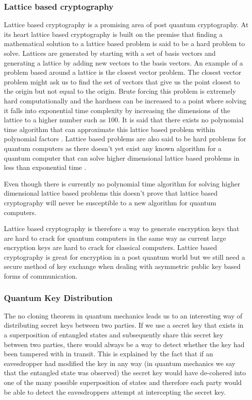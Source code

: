 \documentclass{article}
\begin{document}
\subsubsection{Lattice based cryptography}
Lattice based cryptography is a promising area of post quantum cryptography. At its heart lattice based cryptography is built on the premise that finding a mathematical solution to a lattice based problem is said to be a hard problem to solve. Lattices are generated by starting with a set of basis vectors and generating a lattice by adding new vectors to the basis vectors. An example of a problem based around a lattice is the closest vector problem. The closest vector problem might ask us to find the set of vectors that give us the point closest to the origin but not equal to the origin. Brute forcing this problem is extremely hard computationally and the hardness can be increased to a point where solving it falls into exponential time complexity by increasing the dimensions of the lattice to a higher number such as 100. It is said that there exists no polynomial time algorithm that can approximate this lattice based problem within polynomial factors \cite{Micciancio2008Lattice-based}. Lattice based problems are also said to be hard problems for quantum computers as there doesn't yet exist any known algorithm for a quantum computer that can solve higher dimensional lattice based problems in less than exponential time \cite{Micciancio2008Lattice-based}.

Even though there is currently no polynomial time algorithm for solving higher dimensional lattice based problems this doesn't prove that lattice based cryptography will never be susceptible to a new algorithm for quantum computers.

\vspace{5mm}

Lattice based cryptography is therefore a way to generate encryption keys that are hard to crack for quantum computers in the same way as current large encryption keys are hard to crack for classical computers.  Lattice based cryptography is great for encryption in a post quantum world but we still need a secure method of key exchange when dealing with asymmetric public key based forms of communication.  

\subsubsection{Quantum Key Distribution}
The no cloning theorem in quantum mechanics leads us to an interesting way of distributing secret keys between two parties. If we use a secret key that exists in a superposition of entangled states and subsequently share this secret key between two parties, there would always be a way to detect whether the key had been tampered with in transit. This is explained by the fact that if an eavesdropper had modified the key in any way (in quantum mechanics we say that the entangled state was observed) the secret key would have de-cohered into one of the many possible superposition of states and therefore each party would be able to detect the eavesdroppers attempt at intercepting the secret key. 
\end{document}
